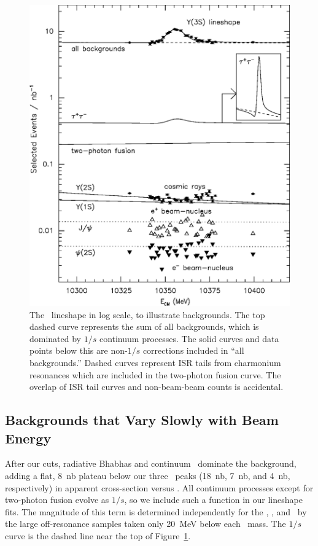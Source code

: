 \documentclass{cornell}
\begin{document}
\begin{figure}[p]
  \begin{center}
    \includegraphics[width=0.9\linewidth]{awesome}
  \end{center}
  \caption[Illustration of backgrounds in log scale]{\label{awesome}
  The \usss\ lineshape in log scale, to illustrate backgrounds.  The
  top dashed curve represents the sum of all backgrounds, which is
  dominated by $1/s$ continuum processes.  The solid curves and data
  points below this are non-$1/s$ corrections included in ``all
  backgrounds.''  Dashed curves represent ISR tails from charmonium
  resonances which are included in the two-photon fusion curve.  The
  overlap of ISR tail curves and non-beam-beam counts is accidental.}
\end{figure}

\subsection{Backgrounds that Vary Slowly with Beam Energy}
\label{sec:varyslowly}

After our cuts, radiative Bhabhas and continuum \qqbar\ dominate the
background, adding a flat, 8~nb plateau below our three \ups\ peaks
(18~nb, 7~nb, and 4~nb, respectively) in apparent cross-section versus
\ecm.  All continuum processes except for two-photon fusion
evolve as $1/s$, so we include such a function in our lineshape fits.
The magnitude of this term is determined independently for the \us,
\uss, and \usss\ by the large off-resonance samples taken only 20~MeV
below each \ups\ mass.  The $1/s$ curve is the dashed line near the top
of Figure~\ref{awesome}.
\end{document}
